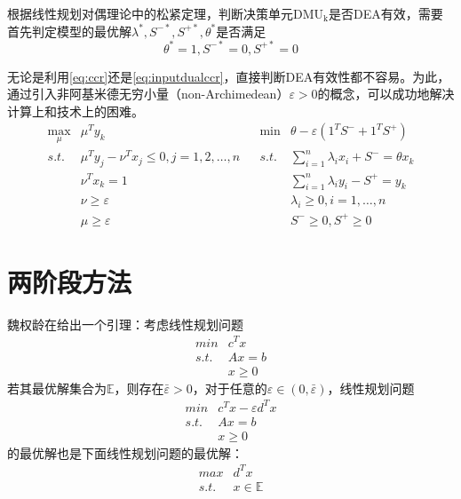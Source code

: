根据线性规划对偶理论中的松紧定理，判断决策单元$\mathrm{DMU_k}$是否DEA有效，需要首先判定模型的最优解$\lambda^{*}, S^{-*},S^{+*},\theta^{*}$是否满足
\begin{equation}
  \theta^{*} = 1, S^{-*} = 0, S^{+*} = 0
\end{equation}

无论是利用\eqref{eq:ccr}还是\eqref{eq:inputdualccr}，直接判断DEA有效性都不容易。为此，通过引入非阿基米德无穷小量（non-Archimedean）$\varepsilon >0$的概念\cite{charnes1952optimality,charnes1957management}，可以成功地解决计算上和技术上的困难。
\begin{equation}\label{eq:eccr}
\begin{array}{lllll}
  \max\limits_{\mu} & \mu^Ty_k & & \min & \theta - \varepsilon(1^T S^{-} + 1^T S^{+}) \\
  \textit{s.t.} & \mu^Ty_j -\nu^Tx_j\leq 0, j=1,2,\dots,n & & \textit{s.t.} & \sum\limits_{i = 1}^n \lambda_i x_i + S^{-} = \theta x_k\\
   & \nu^Tx_k = 1 & & & \sum\limits_{i = 1}^n \lambda_i y_i - S^{+} = y_k\\
   & \nu\geq \varepsilon & & & \lambda_i \ge 0, i = 1, \ldots, n\\
   & \mu\geq \varepsilon & & & S^{-} \ge 0, S^{+}\ge 0
\end{array}
\end{equation}

\section{两阶段方法}%
魏权龄在\cite{wei2004dea}给出一个引理：考虑线性规划问题
\begin{equation}
\begin{array}{ll}
  \textit{min} & c^Tx \\
  \textit{s.t.} & Ax = b \\
  & x \ge 0
\end{array}
\end{equation}
若其最优解集合为$\mathbb{E}$，则存在$\bar{\varepsilon} >0$，对于任意的$\varepsilon\in(0,\bar{\varepsilon})$，线性规划问题
\begin{equation}
\begin{array}{ll}
  \textit{min} & c^Tx - \varepsilon d^Tx \\
  \textit{s.t.} & Ax = b \\
  & x \ge 0
\end{array}
\end{equation}
的最优解也是下面线性规划问题的最优解：
\begin{equation}
\begin{array}{ll}
  \textit{max} & d^Tx \\
  \textit{s.t.} & x \in \mathbb{E}
\end{array}
\end{equation}

